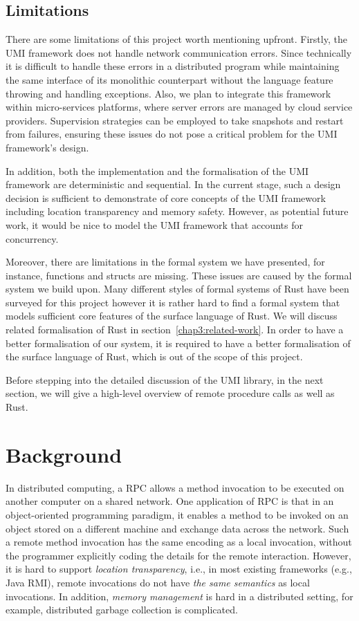 \subsection{Limitations}
There are some limitations of this project worth mentioning upfront. Firstly, the UMI framework does not handle network communication errors. Since technically it is difficult to handle these errors in a distributed program while maintaining the same interface of its monolithic counterpart without the language feature throwing and handling exceptions. Also, we plan to integrate this framework within micro-services platforms, where server errors are managed by cloud service providers. Supervision strategies can be employed to take snapshots and restart from failures, ensuring these issues do not pose a critical problem for the UMI framework's design. 

In addition, both the implementation and the formalisation of the UMI framework are deterministic and sequential. In the current stage, such a design decision is sufficient to demonstrate of core concepts of the UMI framework including location transparency and memory safety. However, as potential future work, it would be nice to model the UMI framework that accounts for concurrency.

Moreover, there are limitations in the formal system we have presented, for instance, functions and structs are missing. These issues are caused by the formal system we build upon. Many different styles of formal systems of Rust have been surveyed for this project however it is rather hard to find a formal system that models sufficient core features of the surface language of Rust. We will discuss related formalisation of Rust in section~\ref{chap3:related-work}. In order to have a better formalisation of our system, it is required to have a better formalisation of the surface language of Rust, which is out of the scope of this project.

Before stepping into the detailed discussion of the UMI library, in the next section, we will give a high-level overview of remote procedure calls as well as Rust.

\section{Background}
\label{chap3:background}
In distributed computing, a RPC allows a method invocation to be executed on another computer on a shared network. One application of RPC is that in an object-oriented programming paradigm, it enables a method to be invoked on an object stored on a different machine and exchange data across the network. Such a remote method invocation has the same encoding as a local invocation, without the programmer explicitly coding the details for the remote interaction.
However, it is hard to support \emph{location transparency}, i.e., in most existing frameworks (e.g., Java RMI), remote invocations do not have \emph{the same semantics} as local invocations. In addition, \emph{memory management} is hard in a distributed setting, for example, distributed garbage collection is complicated.

